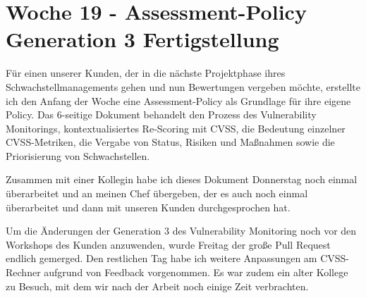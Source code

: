 \section{Woche 19 - Assessment-Policy \headerand Generation 3 Fertigstellung} \label{sec:bericht-wo-19}


\lweekdaymarginpar{\weekdayMondayShort\ - \weekdayWednesdayShort}

Für einen unserer Kunden, der in die nächste Projektphase ihres Schwachstellmanagements gehen und nun Bewertungen vergeben möchte, erstellte ich den Anfang der Woche eine Assessment-Policy als Grundlage für ihre eigene Policy.
Das 6-seitige Dokument behandelt den Prozess des Vulnerability Monitorings, kontextualisiertes Re-Scoring mit CVSS, die Bedeutung einzelner CVSS-Metriken, die Vergabe von Status, Risiken und Maßnahmen sowie die Priorisierung von Schwachstellen.

\sweekdaymarginpar{\weekdayThursdayLong}

Zusammen mit einer Kollegin habe ich dieses Dokument Donnerstag noch einmal überarbeitet und an meinen Chef übergeben, der es auch noch einmal überarbeitet und dann mit unseren Kunden durchgesprochen hat.

\sweekdaymarginpar{\weekdayFridayLong}

Um die Änderungen der Generation 3 des Vulnerability Monitoring noch vor den Workshops des Kunden anzuwenden, wurde Freitag der große Pull Request endlich gemerged.
Den restlichen Tag habe ich weitere Anpassungen am CVSS-Rechner aufgrund von Feedback vorgenommen.
Es war zudem ein alter Kollege zu Besuch, mit dem wir nach der Arbeit noch einige Zeit verbrachten.
